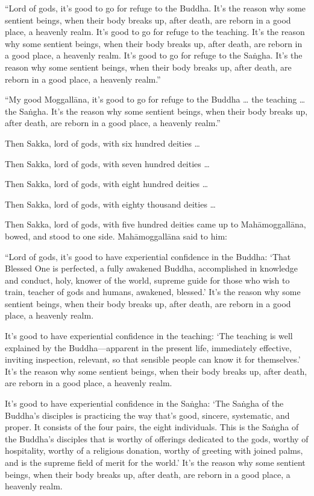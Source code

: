 \documentclass[12pt,openany]{book}%
\begin{document}
“Lord of gods, it’s good to go for refuge to the Buddha. It’s the reason why some sentient beings, when their body breaks up, after death, are reborn in a good place, a heavenly realm. It’s good to go for refuge to the teaching. It’s the reason why some sentient beings, when their body breaks up, after death, are reborn in a good place, a heavenly realm. It’s good to go for refuge to the \textsanskrit{Saṅgha}. It’s the reason why some sentient beings, when their body breaks up, after death, are reborn in a good place, a heavenly realm.” 

“My good \textsanskrit{Moggallāna}, it’s good to go for refuge to the Buddha … the teaching … the \textsanskrit{Saṅgha}. It’s the reason why some sentient beings, when their body breaks up, after death, are reborn in a good place, a heavenly realm.” 

Then Sakka, lord of gods, with six hundred deities … 

Then Sakka, lord of gods, with seven hundred deities … 

Then Sakka, lord of gods, with eight hundred deities … 

Then Sakka, lord of gods, with eighty thousand deities … 

Then Sakka, lord of gods, with five hundred deities came up to \textsanskrit{Mahāmoggallāna}, bowed, and stood to one side. \textsanskrit{Mahāmoggallāna} said to him: 

“Lord of gods, it’s good to have experiential confidence in the Buddha: ‘That Blessed One is perfected, a fully awakened Buddha, accomplished in knowledge and conduct, holy, knower of the world, supreme guide for those who wish to train, teacher of gods and humans, awakened, blessed.’ It’s the reason why some sentient beings, when their body breaks up, after death, are reborn in a good place, a heavenly realm. 

It’s good to have experiential confidence in the teaching: ‘The teaching is well explained by the Buddha—apparent in the present life, immediately effective, inviting inspection, relevant, so that sensible people can know it for themselves.’ It’s the reason why some sentient beings, when their body breaks up, after death, are reborn in a good place, a heavenly realm. 

It’s good to have experiential confidence in the \textsanskrit{Saṅgha}: ‘The \textsanskrit{Saṅgha} of the Buddha’s disciples is practicing the way that’s good, sincere, systematic, and proper. It consists of the four pairs, the eight individuals. This is the \textsanskrit{Saṅgha} of the Buddha’s disciples that is worthy of offerings dedicated to the gods, worthy of hospitality, worthy of a religious donation, worthy of greeting with joined palms, and is the supreme field of merit for the world.’ It’s the reason why some sentient beings, when their body breaks up, after death, are reborn in a good place, a heavenly realm. 
\end{document}
